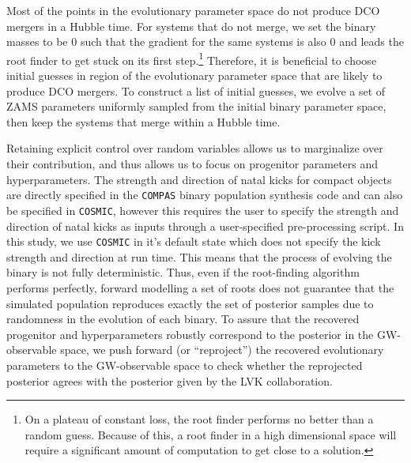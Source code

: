 \documentclass[linenumbers,twocolumn]{aastex631}
\newcommand{\wf}[1]{\textcolor{cyan}{WF: #1}}
\begin{document}
Most of the points in the evolutionary parameter space do not produce DCO
mergers in a Hubble time. For systems that do not merge, we set the binary
masses to be $0$ such that the gradient for the same systems is also $0$ and
leads the root finder to get stuck on its first step.{\footnote{On a plateau of
constant loss, the root finder performs no better than a random guess. Because
of this, a root finder in a high dimensional space will require a significant
amount of computation to get close to a solution.}} Therefore, it is beneficial
to choose initial guesses in region of the evolutionary parameter space that are
likely to produce DCO mergers. To construct a list of initial guesses, we evolve
a set of ZAMS parameters uniformly sampled from the initial binary parameter
space, then keep the systems that merge within a Hubble time.

Retaining explicit control over random variables allows us to marginalize over
their contribution, and thus allows us to focus on progenitor parameters and
hyperparameters. The strength and direction of natal kicks for compact objects 
are directly specified in the \texttt{COMPAS} binary population synthesis code 
\citep{Riley2022} and can also be specified in \texttt{COSMIC}, however 
this requires the user to specify the strength and direction of natal kicks as 
inputs through a user-specified pre-processing script.  In this study, we use 
\texttt{COSMIC} in it's default state which does not specify the kick strength 
and direction at run time. %
This means that the process of evolving the binary
is not fully deterministic. Thus, even if the root-finding algorithm performs
perfectly, forward modelling a set of roots does not guarantee that the
simulated population reproduces exactly the set of posterior samples due to
randomness in the evolution of each binary. To assure that the recovered
progenitor and hyperparameters robustly correspond to the posterior in the
GW-observable space, we push forward (or ``reproject'') the recovered
evolutionary parameters to the GW-observable space to check whether the
reprojected posterior agrees with the posterior given by the LVK collaboration.

\end{document}
